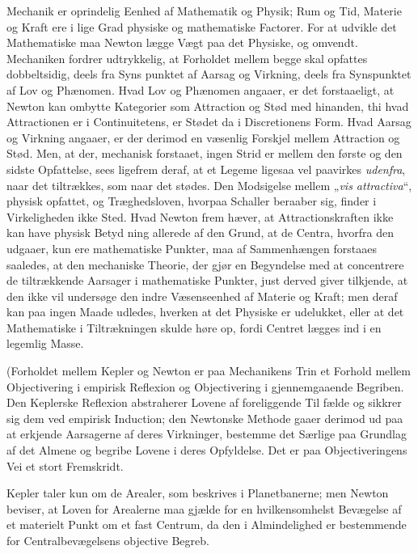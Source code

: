 \documentclass[12pt,a4paper]{book}
\begin{document}
Mechanik er oprindelig Eenhed af Mathematik og Physik; Rum og Tid,
Materie og Kraft ere i lige Grad physiske og mathematiske Factorer.
For at udvikle det Mathematiske maa Newton lægge Vægt paa det
Physiske, og omvendt. Mechaniken fordrer udtrykkelig, at Forholdet
mellem begge skal opfattes dobbeltsidig, deels fra Syns\-%
punktet af Aarsag og Virkning, deels fra Synspunktet af Lov og
Phænomen. Hvad Lov og Phænomen angaaer, er det forstaaeligt, at
Newton kan ombytte Kategorier som Attraction og Stød med hinanden,
thi hvad Attractionen er i Continuitetens, er Stødet da i
Discretionens Form. Hvad Aarsag og Virkning angaaer, er der derimod
en væsenlig Forskjel mellem Attraction og Stød. Men, at der,
mechanisk forstaaet, ingen Strid er mellem den første og den sidste
Opfattelse, sees ligefrem deraf, at et Legeme ligesaa vel paavirkes
\emph{udenfra}, naar det tiltrækkes, som naar det stødes.
Den Modsigelse mellem „\textit{vis attractiva}“, physisk opfattet,
og Træghedsloven, hvorpaa Schaller beraaber sig, finder i
Virkeligheden ikke Sted. Hvad Newton frem\-%
hæver, at Attractionskraften ikke kan have physisk Betyd\-%
ning allerede af den Grund, at de Centra, hvorfra den udgaaer, kun
ere mathematiske Punkter, maa af Sammenhængen forstaaes saaledes,
at den mechaniske Theorie, der gjør en Begyndelse med at
concentrere de tiltrækkende Aarsager i mathematiske Punkter, just
derved giver tilkjende, at den ikke vil undersøge den indre
Væsenseenhed af Materie og Kraft; men deraf kan paa ingen Maade
udledes, hverken at det Physiske er udelukket, eller at det
Mathematiske i Tiltrækningen skulde høre op, fordi Centret lægges
ind i en legemlig Masse.

(Forholdet mellem Kepler og Newton er paa Mechanikens Trin et
Forhold mellem Objectivering i empirisk Reflexion og Objectivering i
gjennemgaaende Begriben. Den Keplerske Reflexion abstraherer Lovene
af foreliggende Til\-%
fælde og sikkrer sig dem ved empirisk Induction; den Newtonske
Methode gaaer derimod ud paa at erkjende Aarsagerne af deres
Virkninger, bestemme det Særlige paa Grundlag af det Almene og
begribe Lovene i deres Opfyldelse. Det er paa Objectiveringens Vei
et stort Fremskridt.

Kepler taler kun om de Arealer, som beskrives i Planetbanerne; men
Newton beviser, at Loven for Arealerne maa gjælde for en
hvilkensomhelst Bevægelse af et materielt Punkt om et fast Centrum,
da den i Almindelighed er bestemmende for Centralbevægelsens
objective Begreb.
\end{document}
